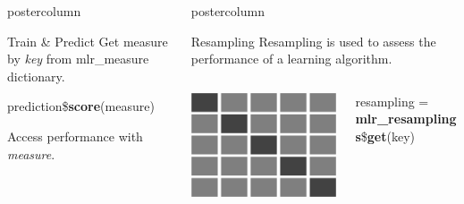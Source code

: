 \documentclass{beamer}
\newlength{\columnheight} %
\begin{document}
\begin{frame}[fragile]{}
\begin{columns}
\begin{column}{.245\textwidth}
\begin{beamercolorbox}[center]{postercolumn}
\begin{minipage}{.98\textwidth}
{\begin{myblock}{Train \& Predict}
					\hspace*{1ex}Get measure by \textit{key} from mlr\_measure dictionary.
					\\
					\begin{codebox}
						prediction\$\textbf{score}(measure)
					\end{codebox}
					\hspace*{1ex}Access performance with \textit{measure}.
				\end{myblock}
										}
			\end{minipage}
		\end{beamercolorbox}
	\end{column}
		\begin{column}{.245\textwidth}
		  \begin{beamercolorbox}[center]{postercolumn}
			   \begin{minipage}{.98\textwidth}
				  \parbox[t][\columnheight]{\textwidth}{
					  \begin{myblock}{Resampling}
						  Resampling is used to assess the performance of a learning algorithm.
						  \\[\baselineskip]
						    \begin{minipage}{\textwidth}
							    \begin{columns}[T]
								    \begin{column}{0.2\textwidth}
									    \includegraphics[width=\textwidth]{img/cross_validation.png}
								    \end{column}
								    \begin{column}{0.8\textwidth}
										  \begin{codebox}
										    resampling = \textbf{mlr\_resamplings}\$\textbf{get}(key)

\end{codebox}
\end{column}
\end{columns}
\end{minipage}
\end{myblock}}
\end{minipage}
\end{beamercolorbox}
\end{column}
\end{columns}
\end{frame}
\end{document}
